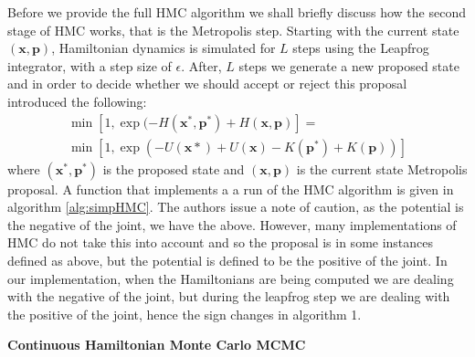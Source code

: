 \documentclass[twoside]{article}
\begin{document}
Before we provide the full HMC algorithm we shall briefly discuss how the second stage of HMC works, that is the Metropolis step. Starting with the current state $(\textbf{x},\textbf{p})$, Hamiltonian dynamics is simulated for $L$ steps using the Leapfrog integrator, with a step size of $\epsilon$. After, $L$ steps we generate a new proposed state and in order to decide whether we should accept or reject this proposal \citep{duane1987hybrid} introduced the following:
\begin{multline}
\min[1, \exp(-H(\textbf{x}^{*}, \textbf{p}^{*}) + H(\textbf{x}, \textbf{p})] =\\
\min[1, \exp(-U(\textbf{x}{*}) + U(\textbf{x}) - K(\textbf{p}^{*}) + K(\textbf{p}))]
\end{multline}where $ (\textbf{x}^{*}, \textbf{p}^{*})$ is the proposed state and $(\textbf{x}, \textbf{p})$ is the current state Metropolis proposal. A function that implements a a run of the HMC algorithm is given in algorithm \ref{alg:simpHMC}. The authors issue a note of caution, as the potential is the negative of the joint, we have the above. However, many implementations of HMC do not take this into account and so the proposal is in some instances defined as above, but the potential is defined to be the positive of the joint. In our implementation, when the Hamiltonians are being computed we are dealing with the negative of the joint, but during the leapfrog step we are dealing with the positive of the joint, hence the sign changes in algorithm 1.  
\begin{algorithm}
	\label{alg:simpHMC}
	\caption{\textbf{Continuous Hamiltonian Monte Carlo MCMC}}
	\begin{algorithmic}[1]
		\EndFor
		  
		\Else
		 
		\EndIf
		\EndFor
		\EndProcedure
	\end{algorithmic} 
\end{algorithm}
\end{document}
